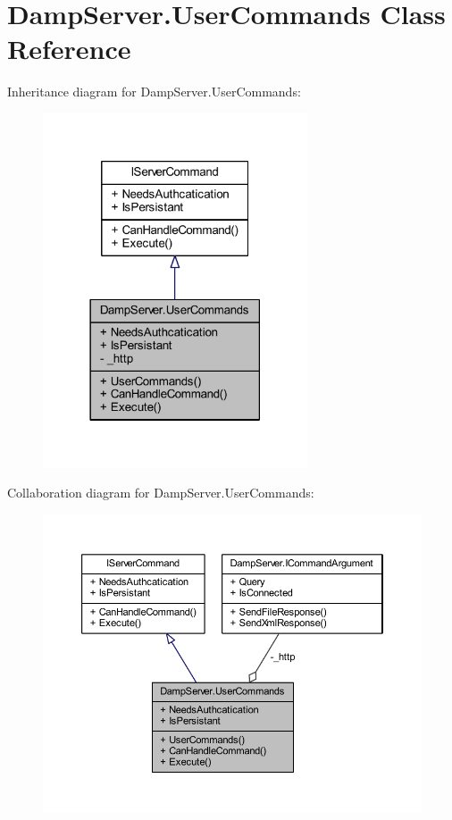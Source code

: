\hypertarget{class_damp_server_1_1_user_commands}{\section{Damp\-Server.\-User\-Commands Class Reference}
\label{class_damp_server_1_1_user_commands}
}


Inheritance diagram for Damp\-Server.\-User\-Commands\-:
\nopagebreak
\begin{figure}[H]
\begin{center}
\leavevmode
\includegraphics[width=222pt]{class_damp_server_1_1_user_commands__inherit__graph}
\end{center}
\end{figure}


Collaboration diagram for Damp\-Server.\-User\-Commands\-:
\nopagebreak
\begin{figure}[H]
\begin{center}
\leavevmode
\includegraphics[width=350pt]{class_damp_server_1_1_user_commands__coll__graph}
\end{center}
\end{figure}
